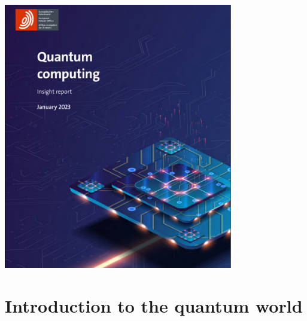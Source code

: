 \begin{frame}[allowframebreaks]{}
    \includegraphics[width=0.75\textwidth, page=3]{pics/introduction/patents.pdf}\\
\end{frame}
\section{Introduction to the quantum world}
